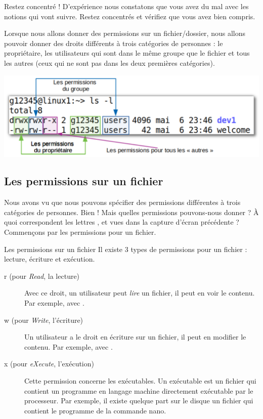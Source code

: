 \documentclass[a4paper,11pt]{style-esi/td}
\begin{document}
		\begin{alerttbox}{Restez concentré !} 
			D'expérience nous constatons que vous avez du mal avec 
			les notions qui vont suivre.
			Restez concentrés et vérifiez que vous avez bien compris.
		\end{alerttbox}
		
		Lorsque nous allons donner des permissions sur un fichier/dossier,
		nous allons pouvoir donner des droits différents à trois catégories
		de personnes : le propriétaire, les utilisateurs qui sont dans le même
		groupe que le fichier et tous les \og{}autres\fg{} 
		(ceux qui ne sont pas dans les deux premières catégories).

		\begin{center}
			\includegraphics[width=.8\textwidth]{image/categorie}
		\end{center}

    \subsection{Les permissions sur un fichier}  

		Nous avons vu que nous pouvons spécifier des permissions différentes
		à trois catégories de personnes.
		Bien ! Mais quelles permissions pouvons-nous donner ?
		À quoi correspondent les lettres ,  et 
		vues dans la capture d'écran précédente ?
		Commençons par les permissions pour un fichier.

		\begin{theorie}{Les permissions sur un fichier}
			Il existe 3 types de permissions pour un fichier : 
			lecture, écriture et exécution.
			\begin{description}
			\item[r (pour \emph{Read}, la lecture)] 
				Avec ce droit, un utilisateur peut 
				\emph{lire} un fichier, il peut en voir le contenu. 
				Par exemple, avec .
			\item[w (pour \emph{Write}, l'écriture)]
				Un utilisateur a le droit en écriture sur un fichier, 
				il peut en modifier le contenu. 
				Par exemple, avec .
			\item[x (pour \emph{eXecute}, l'exécution)]
				Cette permission concerne les exécutables. 
				Un exécutable est un fichier qui contient 
				un programme en langage machine 
				directement exécutable par le processeur.
				Par exemple, il existe quelque part sur le disque 
				un fichier  
				qui contient le programme de la commande nano.
			\end{description}
		\end{theorie}
\end{document}
